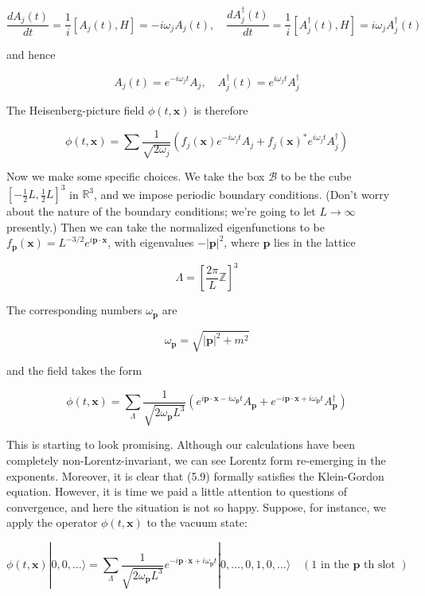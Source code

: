 \documentclass[10pt, letterpaper]{article}
\begin{document}
$$
\frac{d A_{j}(t)}{d t}=\frac{1}{i}\left[A_{j}(t), H\right]=-i \omega_{j} A_{j}(t), \quad \frac{d A_{j}^{\dagger}(t)}{d t}=\frac{1}{i}\left[A_{j}^{\dagger}(t), H\right]=i \omega_{j} A_{j}^{\dagger}(t)
$$

and hence

$$
A_{j}(t)=e^{-i \omega_{j} t} A_{j}, \quad A_{j}^{\dagger}(t)=e^{i \omega_{j} t} A_{j}^{\dagger}
$$

The Heisenberg-picture field $\phi(t, \mathbf{x})$ is therefore

$$
\phi(t, \mathbf{x})=\sum \frac{1}{\sqrt{2 \omega_{j}}}\left(f_{j}(\mathbf{x}) e^{-i \omega_{j} t} A_{j}+f_{j}(\mathbf{x})^{*} e^{i \omega_{j} t} A_{j}^{\dagger}\right)
$$

Now we make some specific choices. We take the box $\mathcal{B}$ to be the cube $\left[-\frac{1}{2} L, \frac{1}{2} L\right]^{3}$ in $\mathbb{R}^{3}$, and we impose periodic boundary conditions. (Don't worry about the nature of the boundary conditions; we're going to let $L \rightarrow \infty$ presently.) Then we can take the normalized eigenfunctions to be $f_{\mathbf{p}}(\mathbf{x})=L^{-3 / 2} e^{i \mathbf{p} \cdot \mathbf{x}}$, with eigenvalues $-|\mathbf{p}|^{2}$, where $\mathbf{p}$ lies in the lattice

$$
\Lambda=\left[\frac{2 \pi}{L} \mathbb{Z}\right]^{3}
$$

The corresponding numbers $\omega_{\mathbf{p}}$ are

$$
\omega_{\mathbf{p}}=\sqrt{|\mathbf{p}|^{2}+m^{2}}
$$

and the field takes the form

$$
\phi(t, \mathbf{x})=\sum_{\Lambda} \frac{1}{\sqrt{2 \omega_{\mathbf{p}} L^{3}}}\left(e^{i \mathbf{p} \cdot \mathbf{x}-i \omega_{\mathbf{p}} t} A_{\mathbf{p}}+e^{-i \mathbf{p} \cdot \mathbf{x}+i \omega_{\mathbf{p}} t} A_{\mathbf{p}}^{\dagger}\right)
$$

This is starting to look promising. Although our calculations have been completely non-Lorentz-invariant, we can see Lorentz form re-emerging in the exponents. Moreover, it is clear that (5.9) formally satisfies the Klein-Gordon equation. However, it is time we paid a little attention to questions of convergence, and here the situation is not so happy. Suppose, for instance, we apply the operator $\phi(t, \mathbf{x})$ to the vacuum state:

$$
\phi(t, \mathbf{x})|0,0, \ldots\rangle=\sum_{\Lambda} \frac{1}{\sqrt{2 \omega_{\mathbf{p}} L^{3}}} e^{-i \mathbf{p} \cdot \mathbf{x}+i \omega_{\mathbf{p}} t}|0, \ldots, 0,1,0, \ldots\rangle \quad(1 \text { in the } \mathbf{p} \text { th slot })
$$
\end{document}

